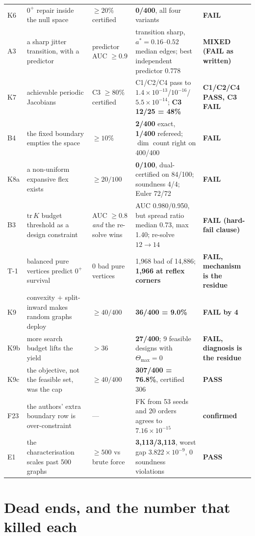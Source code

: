 \documentclass[11pt,a4paper]{article}
\theoremstyle{definition}
\newcommand{\Tmax}{\Theta_{\max}}
\begin{document}
\begin{center}
\begin{longtable}{@{}p{}p{}p{}p{}p{}@{}}
K6 & $0^+$ repair inside the null space & $\ge20\%$ certified & \textbf{0/400}, all four variants & \textbf{FAIL} \\
A3 & a sharp jitter transition, with a predictor & predictor AUC $\ge0.9$ & transition sharp, $a^*=0.16$--$0.52$ median edges; best independent predictor 0.778 & \textbf{MIXED (FAIL as written)} \\
K7 & achievable periodic Jacobians & C3 $\ge80\%$ certified & C1/C2/C4 pass to $1.4\times10^{-13}$/$10^{-16}$/$5.5\times10^{-14}$; \textbf{C3 12/25 = 48\%} & \textbf{C1/C2/C4 PASS, C3 FAIL} \\
B4 & the fixed boundary empties the space & $\ge10\%$ & \textbf{2/400} exact, \textbf{1/400} refereed; $\dim$ count right on 400/400 & \textbf{FAIL} \\
K8a & a non-uniform expansive flex exists & $\ge20/100$ & \textbf{0/100}, dual-certified on 84/100; soundness 4/4; Euler 72/72 & \textbf{FAIL} \\
B3 & $\mathrm{tr}\,K$ budget threshold as a design constraint & AUC $\ge0.8$ \emph{and} the re-solve wins & AUC 0.980/0.950, but spread ratio median 0.73, max 1.40; re-solve $12\to14$ & \textbf{FAIL (hard-fail clause)} \\
T-1 & balanced pure vertices predict $0^+$ survival & 0 bad pure vertices & 1{,}968 bad of 14{,}886; \textbf{1{,}966 at reflex corners} & \textbf{FAIL, mechanism is the residue} \\
K9 & convexity $+$ split-inward makes random graphs deploy & $\ge40/400$ & \textbf{36/400 = 9.0\%} & \textbf{FAIL by 4} \\
K9b & more search budget lifts the yield & $>36$ & \textbf{27/400}; 9 feasible designs with $\Tmax=0$ & \textbf{FAIL, diagnosis is the residue} \\
K9c & the objective, not the feasible set, was the cap & $\ge40/400$ & \textbf{307/400 = 76.8\%}, certified 306 & \textbf{PASS} \\
F23 & the authors' extra boundary row is over-constraint & --- & FK from 53 seeds and 20 orders agrees to $7.16\times10^{-15}$ & \textbf{confirmed} \\
E1 & the characterisation scales past 500 graphs & $\ge500$ vs brute force & \textbf{3{,}113/3{,}113}, worst gap $3.822\times10^{-9}$, 0 soundness violations & \textbf{PASS} \\
\bottomrule
\end{longtable}
\end{center}

\section{Dead ends, and the number that killed each}
\end{document}
